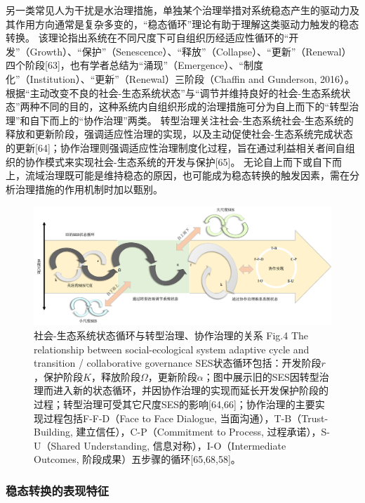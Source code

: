 另一类常见人为干扰是水治理措施，单独某个治理举措对系统稳态产生的驱动力及其作用方向通常是复杂多变的，“稳态循环”理论有助于理解这类驱动力触发的稳态转换。
该理论指出系统在不同尺度下可自组织历经适应性循环的“开发”（Growth）、“保护”（Senescence）、“释放”（Collapse）、“更新”（Renewal）四个阶段[63]，也有学者总结为“涌现”（Emergence）、“制度化”（Institution）、“更新”（Renewal）三阶段（Chaffin and Gunderson, 2016）。
根据“主动改变不良的社会-生态系统状态”与“调节并维持良好的社会-生态系统状态”两种不同的目的，这种系统内自组织形成的治理措施可分为自上而下的“转型治理”和自下而上的“协作治理”两类。
转型治理关注社会-生态系统社会-生态系统的释放和更新阶段，强调适应性治理的实现，以及主动促使社会-生态系统完成状态的更新[64]；协作治理则强调适应性治理制度化过程，旨在通过利益相关者间自组织的协作模式来实现社会-生态系统的开发与保护[65]。
无论自上而下或自下而上，流域治理既可能是维持稳态的原因，也可能成为稳态转换的触发因素，需在分析治理措施的作用机制时加以甄别。

\begin{figure}[htb] %
    \includegraphics[width=\textwidth]{img/ch1/ch1_governance_driver.png}
    \caption[社会-生态系统状态循环]{社会-生态系统状态循环与转型治理、协作治理的关系
    Fig.4  The relationship between social-ecological system adaptive cycle and transition / collaborative governance
    SES状态循环包括：开发阶段$r$，保护阶段$K$，释放阶段$\varOmega$，更新阶段$\alpha$；图中展示旧的SES因转型治理而进入新的状态循环，并因协作治理的实现而延长开发保护阶段的过程；转型治理可受其它尺度SES的影响[64,66]；协作治理的主要实现过程包括F-F-D（Face to Face Dialogue, 当面沟通），T-B（Trust-Building, 建立信任），C-P（Commitment to Process, 过程承诺），S-U（Shared Understanding, 信息对称），I-O（Intermediate Outcomes, 阶段成果）五步骤的循环[65,68,58]。}\label{ch1:fig:governance_driver}
\end{figure}

\subsubsection*{稳态转换的表现特征}

